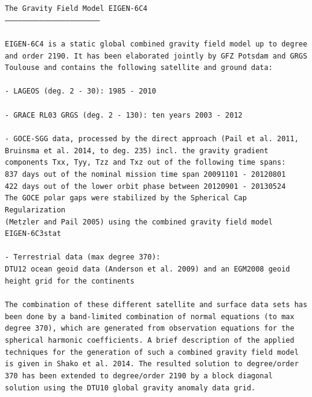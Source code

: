 \documentclass[a4paper,12pt]{book}
\begin{document}
\noindent\texttt{The Gravity Field Model EIGEN-6C4\\
\noindent -----------------------------------------------------------------\\
\\
\noindent EIGEN-6C4 is a static global combined gravity field model up to 
degree and order 2190.  It has been elaborated jointly  by GFZ Potsdam and GRGS 
Toulouse and contains the following  satellite and ground data:
\\
\\
\noindent - LAGEOS (deg. 2 - 30): 1985 - 2010
\\
\\
\noindent - GRACE RL03 GRGS (deg. 2 - 130): ten years 2003 - 2012
\\
\\
\noindent - GOCE-SGG data, processed by the direct approach (Pail et 
al. 2011,\\
\phantom{- }Bruinsma et al. 2014, to deg. 235) incl. the gravity gradient\\
\phantom{- }components Txx, Tyy, Tzz and Txz out of the following time spans:\\
\phantom{- }837 days out of the nominal mission time span 20091101 - 20120801\\
\phantom{- }422 days out of the lower orbit phase between 20120901 - 20130524\\
\phantom{- }The GOCE polar gaps were stabilized by the Spherical Cap 
Regularization\\
\phantom{- }(Metzler and Pail 2005) using the combined gravity field model\\
\phantom{- }EIGEN-6C3stat\\
\\
\noindent - Terrestrial data (max degree 370):\\
\phantom{- }DTU12 ocean geoid data (Anderson et al. 2009) and an EGM2008 geoid 
\phantom{- }height grid for the continents
\\
\\
\noindent The combination of these different satellite and surface data sets 
has been done by a band-limited combination of normal equations (to max degree 
370), which are generated from observation equations for the spherical harmonic 
coefficients. A brief description of the applied techniques for the generation 
of such a combined gravity field model is given in Shako et al. 2014. The 
resulted solution to degree/order 370 has been extended to degree/order 2190 by 
a block diagonal solution using the DTU10 global gravity anomaly data grid.
}
\end{document}
